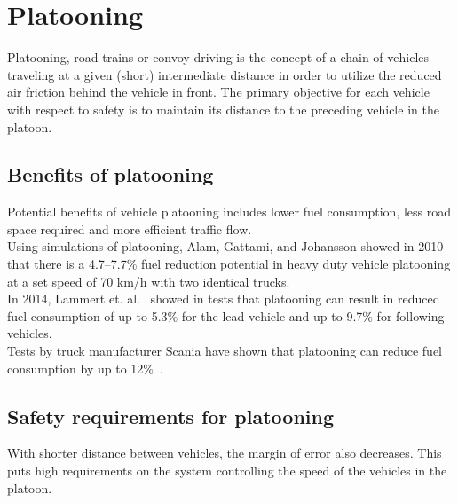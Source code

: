 \section{Platooning}
Platooning, road trains or convoy driving is the concept of a chain of vehicles traveling at a given (short) intermediate distance in order to utilize the reduced air friction behind the vehicle in front. The primary objective for each vehicle with respect to safety is to maintain its distance to the preceding vehicle in the platoon.

\subsection{Benefits of platooning}
Potential benefits of vehicle platooning includes lower fuel consumption, less road space required and more efficient traffic flow.\\ 

Using simulations of platooning, Alam, Gattami, and Johansson \cite{johansson2010} showed in 2010 that there is a \mbox{4.7--7.7\%} fuel reduction potential in heavy duty vehicle platooning at a set speed of 70 km/h with two identical trucks.\\

In 2014, Lammert et. al.~\cite{lammert2014} showed in tests that platooning can result in reduced fuel consumption of up to 5.3\% for the lead vehicle and up to 9.7\% for following vehicles.\\

Tests by truck manufacturer Scania have shown that platooning can reduce fuel consumption by up to 12\%~\cite{scania2015}.

\subsection{Safety requirements for platooning}
With shorter distance between vehicles, the margin of error also decreases. This puts high requirements on the system controlling the speed of the vehicles in the platoon.\\

